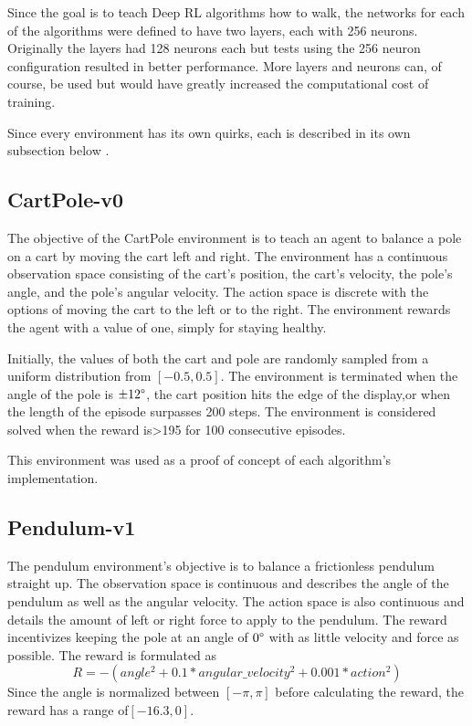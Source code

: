 \documentclass[conference]{IEEEtran}
\begin{document}
Since the goal is to teach Deep RL algorithms how to walk, the networks for each of the algorithms were defined to have two layers, each with 256 neurons. Originally the layers had 128 neurons each but tests using the 256 neuron configuration resulted in better performance. More layers and neurons can, of course, be used but would have greatly increased the computational cost of training.

Since every environment has its own quirks, each is described in its own subsection below \cite {gym_source}.

\subsection{CartPole-v0}

The objective of the CartPole environment is to teach an agent to balance a pole on a cart by moving the cart left and right. The environment has a continuous observation space consisting of the cart's position, the cart's velocity, the pole's angle, and the pole's angular velocity. The action space is discrete with the options of moving the cart to the left or to the right. The environment rewards the agent with a value of one, simply for staying healthy.

Initially, the values of both the cart and pole are randomly sampled from a uniform distribution from $[-0.5, 0.5]$. The environment is terminated when the angle of the pole is $\pm12\degree$, the cart position hits the edge of the display,or when the length of the episode surpasses 200 steps. The environment is considered solved when the reward is\textgreater 195 for 100 consecutive episodes.

This environment was used as a proof of concept of each algorithm's implementation.

\subsection{Pendulum-v1}

The pendulum environment's objective is to balance a frictionless pendulum straight up. The observation space is continuous and describes the angle of the pendulum as well as the angular velocity. The action space is also continuous and details the amount of left or right force to apply to the pendulum. The reward incentivizes keeping the pole at an angle of $0\degree$ with as little velocity and force as possible. The reward is formulated as
$$
    R = -(angle ^{2} + 0.1 * angular\_velocity ^ {2} + 0.001 * action ^ {2})
$$
Since the angle is normalized between $[-\pi, \pi]$ before calculating the reward, the reward has a range of$[-16.3, 0]$.
\end{document}
